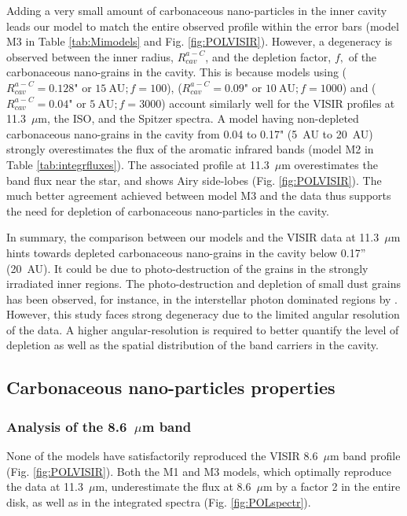 \documentclass{aa}
\newcommand{\mic}{~$\mu$m\xspace}
\begin{document}
Adding a very small amount of carbonaceous nano-particles in the inner cavity leads our model to match the entire observed profile within the error bars (model M3 in Table \ref{tab:Mimodels} and Fig. \ref{fig:POLVISIR}). However, a degeneracy is observed between the inner radius, $R_{cav}^{a-C}$, and the depletion factor, $f,$ of the carbonaceous nano-grains in the cavity. This is because models using ($R_{cav}^{a-C} = 0.128 \text{" or } 15~\text{AU}; f=100$), ($R_{cav}^{a-C} = 0.09 \text{" or } 10~\text{AU}; f=1000$) and ($R_{cav}^{a-C} = 0.04 \text{" or } 5~\text{AU}; f=3000$) account similarly well for the VISIR profiles at 11.3\mic, the ISO, and the Spitzer spectra. A model having non-depleted carbonaceous nano-grains in the cavity from 0.04 to 0.17" (5~AU to 20~AU) strongly overestimates the flux of the aromatic infrared bands (model M2 in Table \ref{tab:integrfluxes}). The associated profile at 11.3\mic overestimates the band flux near the star, and shows Airy side-lobes (Fig. \ref{fig:POLVISIR}). The much better agreement achieved between model M3 and the data thus supports the need for depletion of carbonaceous nano-particles in the cavity.

In summary, the comparison between our models and the VISIR data at 11.3\mic hints towards depleted carbonaceous nano-grains in the cavity below 0.17'' (20~AU). It could be due to photo-destruction of the grains in the strongly irradiated inner regions. The photo-destruction and depletion of small dust grains has been observed, for instance, in the interstellar photon dominated regions by \citet{Schirmer2020}. However, this study faces strong degeneracy due to the limited angular resolution of the data. A higher angular-resolution is required to better quantify the level of depletion as well as the spatial distribution of the band carriers in the cavity.


\subsection{Carbonaceous nano-particles properties} \label{sec:aCproperties_RT}
\subsubsection{Analysis of the 8.6\mic band}
None of the models  have satisfactorily reproduced the VISIR 8.6\mic band profile (Fig. \ref{fig:POLVISIR}). Both the M1 and M3 models, which optimally reproduce the data at 11.3\mic, underestimate the flux at 8.6\mic by a factor 2 in the entire disk, as well as in the integrated spectra (Fig. \ref{fig:POLspectr}). 
\end{document}

